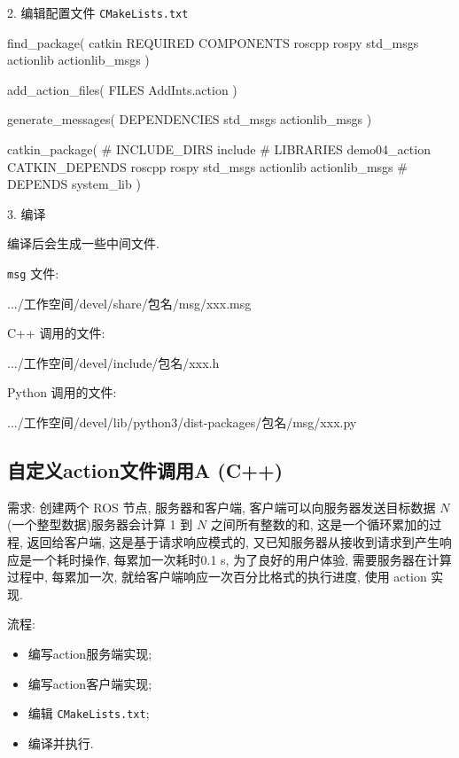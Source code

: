 \documentclass[openany, fontset=windowsold]{ctexbook}
\theoremstyle{kaiti}
\theoremstyle{normal}
\begin{document}
2. 编辑配置文件 \verb|CMakeLists.txt|

\begin{bash}
  find_package(
    catkin REQUIRED COMPONENTS
    roscpp
    rospy
    std_msgs
    actionlib
    actionlib_msgs
  )

  add_action_files(
    FILES
    AddInts.action
  )

  generate_messages(
    DEPENDENCIES
    std_msgs
    actionlib_msgs
  )

  catkin_package(
  #  INCLUDE_DIRS include
  #  LIBRARIES demo04_action
  CATKIN_DEPENDS roscpp rospy std_msgs actionlib actionlib_msgs
  #  DEPENDS system_lib
  )
\end{bash}

3. 编译

编译后会生成一些中间文件.

\verb|msg| 文件:

\begin{bash}
  .../工作空间/devel/share/包名/msg/xxx.msg
\end{bash}

C++ 调用的文件:

\begin{bash}
  .../工作空间/devel/include/包名/xxx.h
\end{bash}

Python 调用的文件:

\begin{bash}
  .../工作空间/devel/lib/python3/dist-packages/包名/msg/xxx.py
\end{bash}

\subsection{自定义action文件调用A (C++)}

需求: 创建两个 ROS 节点, 服务器和客户端, 客户端可以向服务器发送目标数据 $N$ (一个整型数据)服务器会计算 1 到 $N$ 之间所有整数的和, 这是一个循环累加的过程, 返回给客户端, 这是基于请求响应模式的, 又已知服务器从接收到请求到产生响应是一个耗时操作, 每累加一次耗时0.1 s, 为了良好的用户体验, 需要服务器在计算过程中, 每累加一次, 就给客户端响应一次百分比格式的执行进度, 使用 action 实现.

流程:

\begin{itemize}
  \item 编写action服务端实现; 
  \item 编写action客户端实现; 
  \item 编辑 \verb|CMakeLists.txt|; 
  \item 编译并执行.
\end{itemize}
\end{document}
